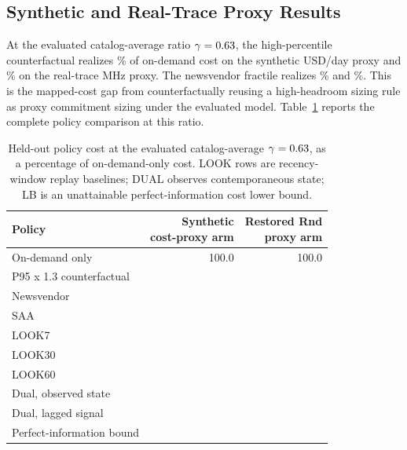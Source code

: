 \documentclass[11pt]{article}
\begin{document}
\FloatBarrier
\subsection{Synthetic and Real-Trace Proxy Results}

At the evaluated catalog-average ratio $\gamma=0.63$, the
high-percentile counterfactual realizes
\polPctHeur\% of on-demand cost on the synthetic USD/day proxy and
\extPolPctHeur\% on the real-trace MHz proxy. The newsvendor fractile realizes
\polPctNv\% and \extPolPctNv\%. This is the mapped-cost gap from counterfactually
reusing a high-headroom sizing rule as proxy commitment sizing under the
evaluated model. Table~\ref{tab:policy-star} reports the complete policy
comparison at this ratio.

\begin{table}[t]
\caption{Held-out policy cost at the evaluated catalog-average
\(\gamma=0.63\), as a percentage of on-demand-only cost. LOOK rows
are recency-window replay baselines; DUAL observes contemporaneous state; LB
is an unattainable perfect-information cost lower bound.}
\label{tab:policy-star}
\centering
\small
\renewcommand{\arraystretch}{1.05}
\begin{tabular}{@{}l r r@{}}
\toprule
Policy & \shortstack{Synthetic\\cost-proxy arm} &
\shortstack{Restored Rnd\\proxy arm} \\
\midrule
On-demand only & 100.0 & 100.0 \\
P95 x 1.3 counterfactual & \polPctHeur{} & \extPolPctHeur{} \\
Newsvendor & \polPctNv{} & \extPolPctNv{} \\
SAA & \polPctSaa{} & \extPolPctSaa{} \\
LOOK7 & \polPctLookSeven{} & \extPolPctLookSeven{} \\
LOOK30 & \polPctLookThirty{} & \extPolPctLookThirty{} \\
LOOK60 & \polPctLookSixty{} & \extPolPctLookSixty{} \\
Dual, observed state & \polPctDual{} & \extPolPctDual{} \\
Dual, lagged signal & \polPctDualc{} & \extPolPctDualc{} \\
Perfect-information bound & \polPctLb{} & \extPolPctLb{} \\
\bottomrule
\end{tabular}
\end{table}
\end{document}

